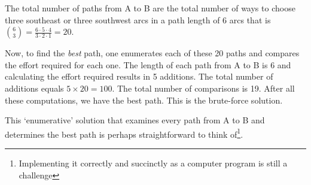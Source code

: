 \documentclass[english,notitlepage,smartquotes]{hgbreport}
\theoremstyle{definition}
\theoremstyle{definition}
\theoremstyle{remark}
\theoremstyle{definition}
\theoremstyle{plain}
\theoremstyle{definition}
\begin{document}
The total number of paths from A to B are the total number of ways to choose three southeast or three southwest arcs in a path length of 6 arcs that is ${6 \choose 3}=\frac{6\cdot 5\cdot 4}{3\cdot 2\cdot 1}=20$. 

Now, to find the \emph{best} path, one enumerates each of these 20 paths and compares the effort required for each one. The length of each path from A to B is 6 and calculating the effort required results in 5 additions. The total number of additions equals $5\times 20=100$. The total number of comparisons is 19. After all these computations, we have the best path. This is the brute-force solution.

This `enumerative' solution that examines every path from A to B and determines the best path is perhaps straightforward to think of\footnote{Implementing it correctly and succinctly as a computer program is still a challenge}. 
\end{document}
